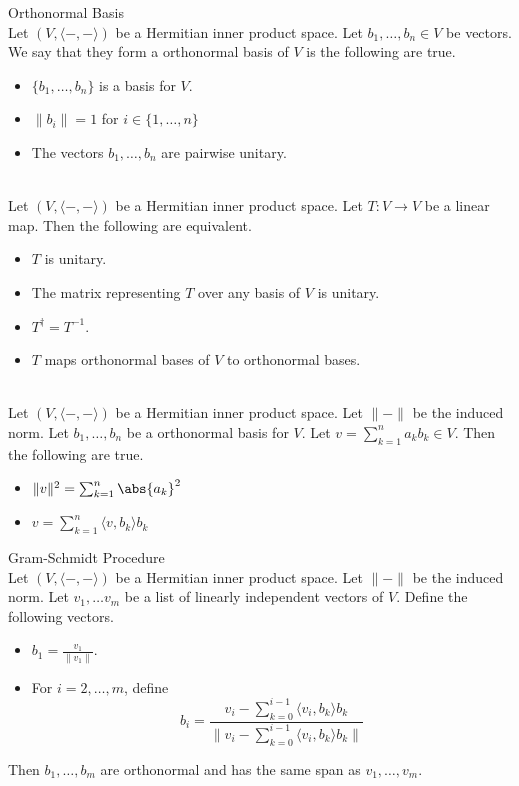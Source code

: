\documentclass[a4paper]{article}
\begin{document}
\begin{defn}{Orthonormal Basis}{}\\
Let $(V,\langle-,-\rangle)$ be a Hermitian inner product space. Let $b_1,\dots,b_n\in V$ be vectors. We say that they form a orthonormal basis of $V$ is the following are true. 
\begin{itemize}
\item $\{b_1,\dots,b_n\}$ is a basis for $V$. 
\item $\|b_i\|=1$ for $i\in\{1,\dots,n\}$
\item The vectors $b_1,\dots,b_n$ are pairwise unitary. 
\end{itemize}
\end{defn}

\begin{prp}{}{}\\
Let $(V,\langle-,-\rangle)$ be a Hermitian inner product space. Let $T:V\to V$ be a linear map. Then the following are equivalent. 
\begin{itemize}
\item $T$ is unitary. 
\item The matrix representing $T$ over any basis of $V$ is unitary. 
\item $T^\dagger=T^{-1}$. 
\item $T$ maps orthonormal bases of $V$ to orthonormal bases. 
\end{itemize}
\end{prp}

\begin{prp}{}{}\\
Let $(V,\langle-,-\rangle)$ be a Hermitian inner product space. Let $\|-\|$ be the induced norm. Let $b_1,\dots,b_n$ be a orthonormal basis for $V$. Let $v=\sum_{k=1}^na_kb_k\in V$. Then the following are true. 
\begin{itemize}
\item $\|v\|^2=\sum_{k=1}^n\abs{a_k}^2$
\item $v=\sum_{k=1}^n\langle v,b_k\rangle b_k$
\end{itemize} 
\end{prp}

\begin{thm}{Gram-Schmidt Procedure}{}\\
Let $(V,\langle-,-\rangle)$ be a Hermitian inner product space. Let $\|-\|$ be the induced norm. Let $v_1,\dots v_m$ be a list of linearly independent vectors of $V$. Define the following vectors. 
\begin{itemize}
\item $b_1=\frac{v_1}{\|v_1\|}$. 
\item For $i=2,\dots,m$, define $$b_i=\frac{v_i-\sum_{k=0}^{i-1}\langle v_i,b_k\rangle b_k}{\|v_i-\sum_{k=0}^{i-1}\langle v_i,b_k\rangle b_k\|}$$
\end{itemize}
Then $b_1,\dots,b_m$ are orthonormal and has the same span as $v_1,\dots,v_m$. 
\end{thm}
\end{document}
